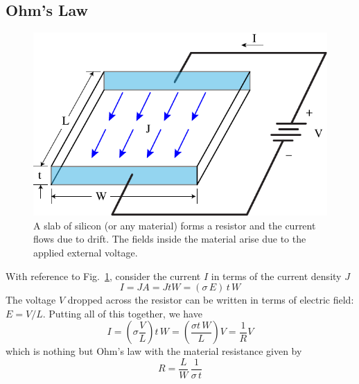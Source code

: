 \subsection{Ohm’s Law}
\begin{figure}[tb]
\begin{center}
\includegraphics[width=.5\columnwidth]{ohms_law_slab}
\end{center}
\caption{A slab of silicon (or any material) forms a resistor and the current flows due to drift.  The fields inside the material arise due to the applied external voltage.}
\label{fig:ohms_law_slab}
\end{figure}

With reference to Fig.~\ref{fig:ohms_law_slab}, consider the current $I$ in terms of the current density $J$
\begin{equation}
 I = JA = JtW = (\sigma \,E) \,t\,W
\end{equation}   
The voltage $V$ dropped across the resistor can be written in terms of electric field:  $E = V/L$.  Putting all of this together, we have
\begin{equation} 
	I =  \left( \sigma\frac{V}{L} \right) t\,W = \left( \frac{\sigma t\,W} {L} \right)  V= \frac{1}{R} V
\end{equation}
which is nothing but Ohm's law with the material resistance given by
\begin{equation} 
	R = \frac{L}{W}\,\frac{1}{{\sigma \,t}} 
\end{equation}
